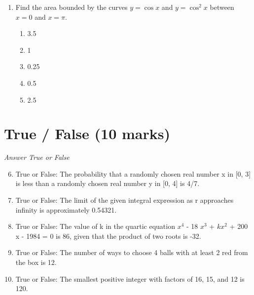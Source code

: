 \documentclass[12pt]{article}
\begin{document}
\begin{enumerate}[label=\arabic*.]
\begin{enumerate}[label=(\alph*)]
    \item 13 in.
    \item 10 in.
    \item 11 in.
    \item 45.0 in.
    \item 15 in.
\end{enumerate}
\item Find the area bounded by the curves $y=\cos x$ and $y=\cos ^2 x$ between $x=0$ and $x=\pi$.
\begin{enumerate}[label=(\alph*)]
    \item 3.5
    \item 1
    \item 0.25
    \item 0.5
    \item 2.5
\end{enumerate}
\end{enumerate}

\section*{True / False (10 marks)}
\textit{Answer True or False}
\begin{enumerate}[label=\arabic*.]
\setcounter{enumi}{5}
\item True or False: The probability that a randomly chosen real number x in [0, 3] is less than a randomly chosen real number y in [0, 4] is 4/7.
\item True or False: The limit of the given integral expression as r approaches infinity is approximately 0.54321.
\item True or False: The value of k in the quartic equation $x^4$ - 18 $x^3$ + $kx^2$ + 200 x - 1984 = 0 is 86, given that the product of two roots is -32.
\item True or False: The number of ways to choose 4 balls with at least 2 red from the box is 12.
\item True or False: The smallest positive integer with factors of 16, 15, and 12 is 120.
\end{enumerate}
\end{document}
